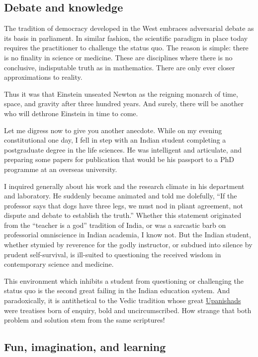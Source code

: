 \documentclass[
  a4paper,
]{article}
\begin{document}
\hypertarget{debate-and-knowledge}{%
\subsection{Debate and knowledge}\label{debate-and-knowledge}}

The tradition of democracy developed in the West embraces adversarial
debate as its basis in parliament. In similar fashion, the scientific
paradigm in place today requires the practitioner to challenge the
status quo. The reason is simple: there is no finality in science or
medicine. These are disciplines where there is no conclusive,
indisputable truth as in mathematics. There are only ever closer
approximations to reality.

Thus it was that Einstein unseated Newton as the reigning monarch of
time, space, and gravity after three hundred years. And surely, there
will be another who will dethrone Einstein in time to come.

Let me digress now to give you another anecdote. While on my evening
constitutional one day, I fell in step with an Indian student completing
a postgraduate degree in the life sciences. He was intelligent and
articulate, and preparing some papers for publication that would be his
passport to a PhD programme at an overseas university.

I inquired generally about his work and the research climate in his
department and laboratory. He suddenly became animated and told me
dolefully, ``If the professor says that dogs have three legs, we must
nod in pliant agreement, not dispute and debate to establish the
truth.'' Whether this statement originated from the ``teacher is a god''
tradition of India, or was a sarcastic barb on professorial omniscience
in Indian academia, I know not. But the Indian student, whether stymied
by reverence for the godly instructor, or subdued into silence by
prudent self-survival, is ill-suited to questioning the received wisdom
in contemporary science and medicine.

This environment which inhibits a student from questioning or
challenging the status quo is the second great failing in the Indian
education system. And paradoxically, it is antithetical to the Vedic
tradition whose great
\href{http://en.wikipedia.org/wiki/Upanishads}{Upanishads} were
treatises born of enquiry, bold and uncircumscribed. How strange that
both problem and solution stem from the same scriptures!

\hypertarget{fun-imagination-and-learning}{%
\subsection{Fun, imagination, and
learning}\label{fun-imagination-and-learning}}
\end{document}
